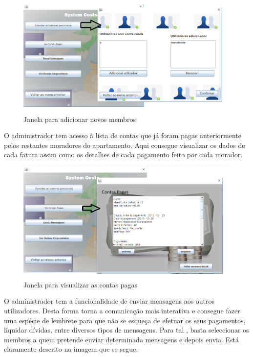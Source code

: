 \begin{figure}[h!]
	\centering
	\includegraphics[scale=0.6]{imagens/interface/botaoadicionamorador}  
	\caption{Janela para adicionar novos membros}  
\end{figure}

O administrador tem acesso à lista de contas que já foram pagas anteriormente pelos restantes moradores do apartamento. Aqui consegue visualizar os dados de cada fatura assim como os detalhes de cada pagamento feito por cada morador.

\begin{figure}[h!]
	\centering
	\includegraphics[scale=0.6]{imagens/interface/adminvercontaspagas}  
	\caption{Janela para visualizar as contas pagas}  
\end{figure}

\newpage \clearpage

O administrador tem a funcionalidade de enviar mensagens aos outros utilizadores. Desta forma torna a comunicação mais interativa e consegue fazer uma espécie de lembrete para que não se esqueça de efetuar os seus pagamentos, liquidar dívidas, entre diversos tipos de mensagens. Para tal , basta seleccionar os membros a quem pretende enviar determinada mensagens e depois envia. Está claramente descrito na imagem que se segue. 

